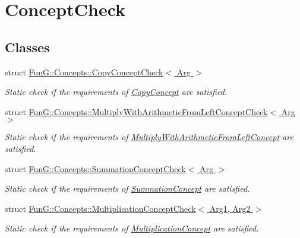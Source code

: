 \hypertarget{group__ConceptCheck}{\section{\-Concept\-Check}
\label{group__ConceptCheck}
}
\subsection*{\-Classes}
\begin{DoxyCompactItemize}
\item 
struct \hyperlink{structFunG_1_1Concepts_1_1CopyConceptCheck}{\-Fun\-G\-::\-Concepts\-::\-Copy\-Concept\-Check$<$ Arg $>$}
\begin{DoxyCompactList}\small\item\em \-Static check if the requirements of \hyperlink{structFunG_1_1Concepts_1_1CopyConcept}{\-Copy\-Concept} are satisfied. \end{DoxyCompactList}\item 
struct \hyperlink{structFunG_1_1Concepts_1_1MultiplyWithArithmeticFromLeftConceptCheck}{\-Fun\-G\-::\-Concepts\-::\-Multiply\-With\-Arithmetic\-From\-Left\-Concept\-Check$<$ Arg $>$}
\begin{DoxyCompactList}\small\item\em \-Static check if the requirements of \hyperlink{structFunG_1_1Concepts_1_1MultiplyWithArithmeticFromLeftConcept}{\-Multiply\-With\-Arithmetic\-From\-Left\-Concept} are satisfied. \end{DoxyCompactList}\item 
struct \hyperlink{structFunG_1_1Concepts_1_1SummationConceptCheck}{\-Fun\-G\-::\-Concepts\-::\-Summation\-Concept\-Check$<$ Arg $>$}
\begin{DoxyCompactList}\small\item\em \-Static check if the requirements of \hyperlink{structFunG_1_1Concepts_1_1SummationConcept}{\-Summation\-Concept} are satisfied. \end{DoxyCompactList}\item 
struct \hyperlink{structFunG_1_1Concepts_1_1MultiplicationConceptCheck}{\-Fun\-G\-::\-Concepts\-::\-Multiplication\-Concept\-Check$<$ Arg1, Arg2 $>$}
\begin{DoxyCompactList}\small\item\em \-Static check if the requirements of \hyperlink{structFunG_1_1Concepts_1_1MultiplicationConcept}{\-Multiplication\-Concept} are satisfied. \end{DoxyCompactList}\item 

\end{DoxyCompactItemize}
